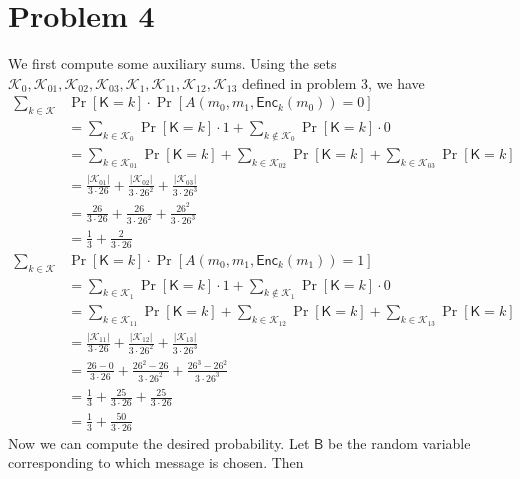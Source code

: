 \documentclass[12pt]{article}
\numberwithin{equation}{section}
\theoremstyle{plain}
\DeclareMathOperator*{\prob}{Pr}
\newcommand{\keys}{\mathcal{K}}
\newcommand{\key}{\algo{K}}
\newcommand{\algo}[1]{\mathsf{#1}}
\newcommand{\enc}{\algo{Enc}}
\begin{document}
\section*{Problem 4}

\newcommand{\bit}{\algo{B}}

We first compute some auxiliary sums.
Using the sets $\keys_0, \keys_{01}, \keys_{02}, \keys_{03}, \keys_1, \keys_{11}, \keys_{12}, \keys_{13}$ defined in problem 3,
we have
\begin{align*}
    \sum_{k \in \keys}&{ \prob[\key = k] \cdot \prob[A(m_0, m_1, \enc_k(m_0)) = 0] }\\
        &= \sum_{k \in \keys_0} \prob[\key = k] \cdot 1 + \sum_{k \not\in \keys_0} \prob[\key = k] \cdot 0\\
        &= \sum_{k \in \keys_{01}}{ \prob[\key = k] } + \sum_{k \in \keys_{02}}{ \prob[\key = k] } + \sum_{k \in \keys_{03}}{ \prob[\key = k] }\\
        &= \frac{|\keys_{01}|}{3 \cdot 26} + \frac{|\keys_{02}|}{3 \cdot 26^2} + \frac{|\keys_{03}|}{3 \cdot 26^3}\\
        &= \frac{26}{3 \cdot 26} + \frac{26}{3 \cdot 26^2} + \frac{26^2}{3 \cdot 26^3}\\
        &= \frac{1}{3} + \frac{2}{3 \cdot 26}\\
    \sum_{k \in \keys}&{ \prob[\key = k] \cdot \prob[A(m_0, m_1, \enc_k(m_1)) = 1] }\\
        &= \sum_{k \in \keys_1} \prob[\key = k] \cdot 1 + \sum_{k \not\in \keys_1} \prob[\key = k] \cdot 0\\
        &= \sum_{k \in \keys_{11}}{ \prob[\key = k] } + \sum_{k \in \keys_{12}}{ \prob[\key = k] } + \sum_{k \in \keys_{13}}{ \prob[\key = k] }\\
        &= \frac{|\keys_{11}|}{3 \cdot 26} + \frac{|\keys_{12}|}{3 \cdot 26^2} + \frac{|\keys_{13}|}{3 \cdot 26^3}\\
        &= \frac{26 - 0}{3 \cdot 26} + \frac{26^2 - 26}{3 \cdot 26^2} + \frac{26^3 - 26^2}{3 \cdot 26^3}\\
        &= \frac{1}{3} + \frac{25}{3 \cdot 26} + \frac{25}{3 \cdot 26}\\
        &= \frac{1}{3} + \frac{50}{3 \cdot 26}
\end{align*}
Now we can compute the desired probability.
Let $\bit$ be the random variable corresponding to which message is chosen.
Then
\end{document}
